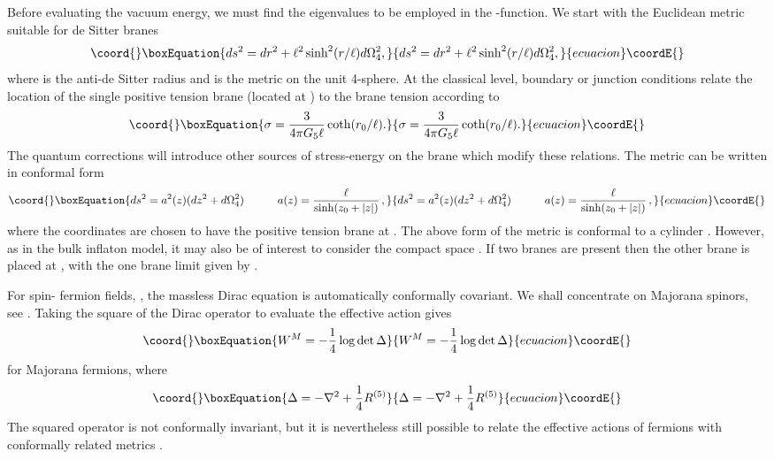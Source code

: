 \documentclass[a4paper,a4paper]{article}
\begin{document}
Before evaluating the vacuum energy, we must find the eigenvalues to be 
employed in the \myHighlight{$\zeta$}\coordHE{}-function.
We start with the Euclidean metric suitable for de Sitter branes \cite{GS}
\begin{equation}\coord{}\boxEquation{
ds^2 =dr^2+\ell^2\sinh^2(r/\ell)d\Omega^2_4,
\label{orig}
}{
ds^2 =dr^2+\ell^2\sinh^2(r/\ell)d\Omega^2_4,
}{ecuacion}\coordE{}\end{equation}
where \coordHE{} is the anti-de Sitter radius and
\coordHE{} is the metric on the unit 4-sphere.
At the classical level, boundary or junction conditions relate the location of the 
single positive tension brane (located at \coordHE{}) to the brane 
tension \myHighlight{$\sigma$}\coordHE{} according to \cite{GS}
\begin{equation}\coord{}\boxEquation{
\sigma=\frac{3}{4\pi G_5 \ell}\coth(r_0/\ell).
}{
\sigma=\frac{3}{4\pi G_5 \ell}\coth(r_0/\ell).
}{ecuacion}\coordE{}\end{equation}
The quantum corrections will introduce other sources of stress-energy on the
brane which modify these relations. The metric can be written in conformal 
form
\begin{equation}\coord{}\boxEquation{
ds^2 =a^2(z)(dz^2+d\Omega^2_4)
\quad\qquad a(z)=\frac{\ell}{\sinh(z_0+|z|)}\,,
\label{metric}
}{
ds^2 =a^2(z)(dz^2+d\Omega^2_4)
\quad\qquad a(z)=\frac{\ell}{\sinh(z_0+|z|)}\,,
}{ecuacion}\coordE{}\end{equation}
where the coordinates are chosen to have the positive tension brane at \coordHE{}.
The above form of the metric is conformal to a cylinder \coordHE{}.
However, as in the bulk inflaton model, it may also be of interest to consider the 
compact space \coordHE{} \cite{GS}. If two branes are present then 
the other brane is placed at \coordHE{}, with the one brane limit given by 
\coordHE{}.


For spin-\coordHE{} fermion fields, \myHighlight{$\psi$}\coordHE{}, the massless Dirac equation is 
automatically conformally covariant. We shall concentrate on Majorana spinors, 
see \cite{MNSS}. Taking the square of the Dirac operator to evaluate the effective 
action gives
\begin{equation}\coord{}\boxEquation{
W^M=-\frac14\log\det\Delta
}{
W^M=-\frac14\log\det\Delta
}{ecuacion}\coordE{}\end{equation}
for Majorana fermions, where
\begin{equation}\coord{}\boxEquation{
\Delta=-\nabla^2+\frac14{}R^{(5)}
}{
\Delta=-\nabla^2+\frac14{}R^{(5)}
}{ecuacion}\coordE{}\end{equation}
The squared operator is not conformally invariant, but it is nevertheless 
still possible to relate the effective actions of fermions with conformally 
related metrics \cite{MOSS2}.
\end{document}
